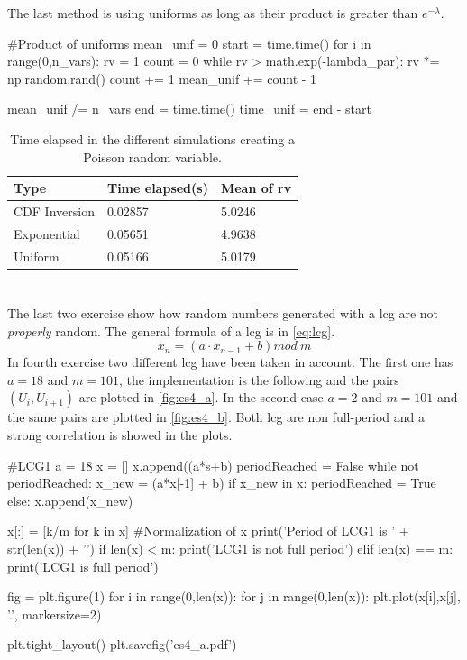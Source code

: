 \documentclass[11pt,a4paper]{article}
\begin{document}
The last method is using uniforms as long as their product is greater than $e^{-\lambda}$.
\begin{python}
  #Product of uniforms
mean_unif = 0
start = time.time()
for i in range(0,n_vars):
    rv = 1
    count = 0
    while rv > math.exp(-lambda_par):
        rv *= np.random.rand()
        count += 1
    mean_unif += count - 1

mean_unif /= n_vars
end = time.time()
time_unif = end - start
\end{python}

\begin{table}[ht]
\small
	\centering
    \renewcommand{\arraystretch}{1}%
	\begin{tabular}{@{}lll@{}}
	\toprule
    Type & Time elapsed(s) & Mean of rv\\ \midrule
    CDF Inversion & 0.02857 & 5.0246\\
    Exponential & 0.05651 & 4.9638\\
    Uniform & 0.05166 & 5.0179\\
    \bottomrule
    \end{tabular}
	\caption{Time elapsed in the different simulations creating a Poisson random variable.}
	\label{table:simTimePoisson}
\end{table}

\section{}
The last two exercise show how random numbers generated with a \gls{lcg} are not \textit{properly} random.
The general formula of a \gls{lcg} is in \autoref{eq:lcg}.
\begin{equation}
  \label{eq:lcg}
  x_n = (a \cdot x_{n-1} + b)mod ~m
\end{equation}
In fourth exercise two different \gls{lcg} have been taken in account. The first one has $a = 18$ and $m = 101$, the implementation is the following and the pairs $(U_i, U_{i+1})$ are plotted in \autoref{fig:es4_a}. In the second case $a = 2$ and $m = 101$ and the same pairs are plotted in \autoref{fig:es4_b}. Both \gls{lcg} are non full-period and a strong correlation is showed in the plots.
\begin{python}
  #LCG1
  a = 18
  x = []
  x.append((a*s+b)%
  periodReached = False
  while not periodReached:
  x_new =  (a*x[-1] + b)%
  if x_new in x:
  periodReached = True
  else:
  x.append(x_new)

  x[:] = [k/m for k in x] #Normalization of x
  print('Period of LCG1 is ' + str(len(x)) + '\n')
  if len(x) < m:
  print('LCG1 is not full period')
  elif len(x) == m:
  print('LCG1 is full period')

  fig = plt.figure(1)
  for i in range(0,len(x)):
  for j in range(0,len(x)):
  plt.plot(x[i],x[j], '.', markersize=2)

  plt.tight_layout()
  plt.savefig('es4_a.pdf')
\end{python}
\end{document}
